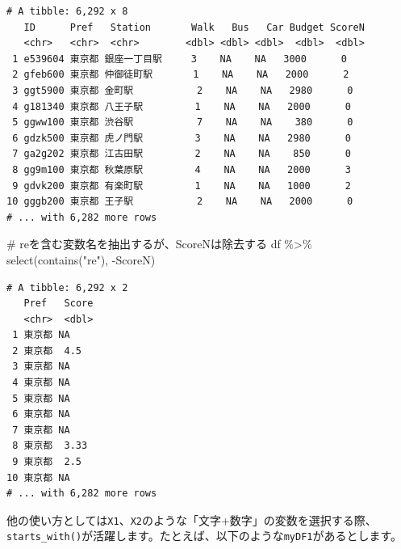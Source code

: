 \documentclass[
  a4paper,
  pandoc,
  ja=standard,
  jafont=haranoaji]{bxjsbook}
\newenvironment{Shaded}{\begin{snugshade}}{\end{snugshade}}
\newcommand{\CommentTok}[1]{\textcolor[rgb]{0.37,0.37,0.37}{#1}}
\newcommand{\FunctionTok}[1]{\textcolor[rgb]{0.28,0.35,0.67}{#1}}
\newcommand{\NormalTok}[1]{\textcolor[rgb]{0.00,0.48,0.65}{#1}}
\newcommand{\SpecialCharTok}[1]{\textcolor[rgb]{0.37,0.37,0.37}{#1}}
\newcommand{\StringTok}[1]{\textcolor[rgb]{0.13,0.47,0.30}{#1}}
\begin{document}
\begin{verbatim}
# A tibble: 6,292 x 8
   ID      Pref   Station       Walk   Bus   Car Budget ScoreN
   <chr>   <chr>  <chr>        <dbl> <dbl> <dbl>  <dbl>  <dbl>
 1 e539604 東京都 銀座一丁目駅     3    NA    NA   3000      0
 2 gfeb600 東京都 仲御徒町駅       1    NA    NA   2000      2
 3 ggt5900 東京都 金町駅           2    NA    NA   2980      0
 4 g181340 東京都 八王子駅         1    NA    NA   2000      0
 5 ggww100 東京都 渋谷駅           7    NA    NA    380      0
 6 gdzk500 東京都 虎ノ門駅         3    NA    NA   2980      0
 7 ga2g202 東京都 江古田駅         2    NA    NA    850      0
 8 gg9m100 東京都 秋葉原駅         4    NA    NA   2000      3
 9 gdvk200 東京都 有楽町駅         1    NA    NA   1000      2
10 gggb200 東京都 王子駅           2    NA    NA   2000      0
# ... with 6,282 more rows
\end{verbatim}

\begin{Shaded}
\begin{Highlighting}[numbers=left,,]
\CommentTok{\# reを含む変数名を抽出するが、ScoreNは除去する}
\NormalTok{df }\SpecialCharTok{\%\textgreater{}\%}
  \FunctionTok{select}\NormalTok{(}\FunctionTok{contains}\NormalTok{(}\StringTok{"re"}\NormalTok{), }\SpecialCharTok{{-}}\NormalTok{ScoreN)}
\end{Highlighting}
\end{Shaded}

\begin{verbatim}
# A tibble: 6,292 x 2
   Pref   Score
   <chr>  <dbl>
 1 東京都 NA   
 2 東京都  4.5 
 3 東京都 NA   
 4 東京都 NA   
 5 東京都 NA   
 6 東京都 NA   
 7 東京都 NA   
 8 東京都  3.33
 9 東京都  2.5 
10 東京都 NA   
# ... with 6,282 more rows
\end{verbatim}

他の使い方としては\texttt{X1}、\texttt{X2}のような「文字+数字」の変数を選択する際、\texttt{starts\_with()}が活躍します。たとえば、以下のような\texttt{myDF1}があるとします。
\end{document}
